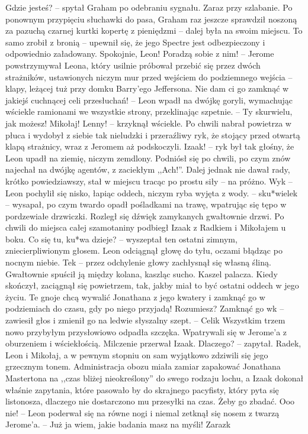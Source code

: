 \documentclass[../MAIN.tex]{subfiles}
\begin{document}
\sx Gdzie jesteś? -- spytał Graham po odebraniu sygnału.
\xx Zaraz przy szlabanie.
\qd
Po ponownym przypięciu słuchawki do pasa, Graham raz jeszcze sprawdził noszoną za pazuchą czarnej kurtki kopertę z pieniędzmi -- dalej była na swoim miejscu. To samo zrobił z bronią -- upewnił się, że jego Spectre jest odbezpieczony i odpowiednio załadowany.
\sx Spokojnie, Leon! Poradzą sobie z nim! -- Jerome powstrzymywał Leona, który usilnie próbował przebić się przez dwóch strażników, ustawionych niczym mur przed wejściem do podziemnego wejścia -- klapy, leżącej tuż przy domku Barry’ego Jeffersona.
\xx Nie dam ci go zamknąć w jakiejś cuchnącej celi przesłuchań! -- Leon wpadł na dwójkę goryli, wymachując wściekle ramionami we wszystkie strony, przeklinając szpetnie. -- Ty skurwielu, jak możesz! Mikołaj! Lenny! -- krzyknął wściekle. Po chwili nabrał powietrza w płuca i wydobył z siebie tak nieludzki i przeraźliwy ryk, że stojący przed otwartą klapą strażnicy, wraz z Jeromem aż podskoczyli.
\xx Izaak! -- ryk był tak głośny, że Leon upadł na ziemię, niczym zemdlony. Podniósł się po chwili, po czym znów najechał na dwójkę agentów, z zaciekłym ,,Ach!''. Dalej jednak nie dawał rady, krótko powiedziawszy, stał w miejscu tracąc po prostu siły -- na próżno.
\xx Wy\3k -- Leon pochylił się nisko, łapiąc oddech, niczym ryba wyjęta z wody. -- sku*wiele\3k -- wysapał, po czym twardo opadł pośladkami na trawę, wpatrując się tępo w pordzewiałe drzwiczki.
Rozległ się dźwięk zamykanych gwałtownie drzwi. Po chwili do miejsca całej szamotaniny podbiegł Izaak z Radkiem i Mikołajem u boku.
\xx Co się tu, ku*wa dzieje? -- wyszeptał ten ostatni zimnym, zniecierpliwionym głosem.
\qd
Leon odciągnął głowę do tyłu, oczami błądząc po nocnym niebie.
\sx Te\3k -- przez odchylenie głowy zachłysnął się własną śliną.
\qd
Gwałtownie spuścił ją między kolana, kaszląc sucho. Kaszel palacza. Kiedy skończył, zaciągnął się powietrzem, tak, jakby miał to być ostatni oddech w jego życiu. 
\sx Te gnoje chcą wywalić Jonathana z jego kwatery i zamknąć go w podziemiach do czasu, gdy po niego przyjadą! Rozumiesz? Zamknąć go w\3k -- zawiesił głos i zmienił go na ledwie słyszalny szept. -- Celi\3k
\qd
Wszystkim trzem nowo przybyłym przysłowiowo odpadła szczęka. Wpatrywali się w Jerome’a z oburzeniem i wściekłością. Milczenie przerwał Izaak.
\sx Dlaczego? -- zapytał.
\qd
Radek, Leon i Mikołaj, a w pewnym stopniu on sam wyjątkowo zdziwili się jego grzecznym tonem. Administracja obozu miała zamiar zapakować Jonathana Mastertona na ,,czas bliżej nieokreślony'' do swego rodzaju lochu, a Izaak dokonał właśnie zapytania, które pasowało by do skrajnego pacyfisty, który pyta się listonosza, dlaczego nie dostarczono mu przesyłki na czas.
\sx Żeby go zbadać.
\xx Ooo nie! -- Leon poderwał się na równe nogi i niemal zetknął się nosem z twarzą Jerome’a. -- Już ja wiem, jakie badania masz na myśli! Zaraz\3k
\qd
\end{document}
